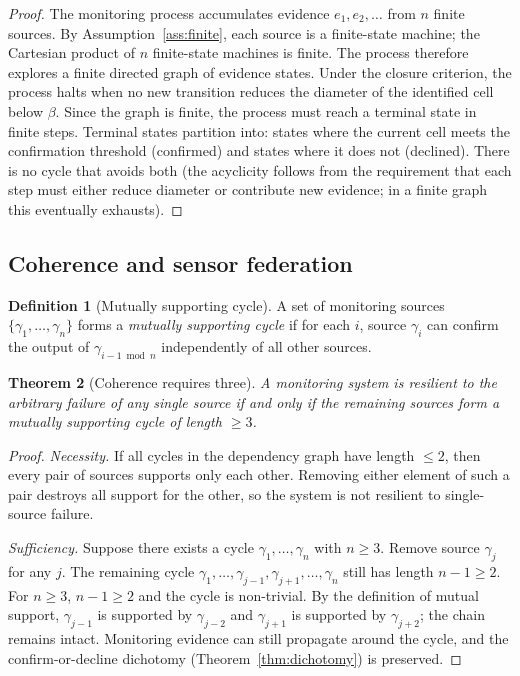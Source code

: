 \documentclass[11pt,twocolumn,a4paper]{article}
\theoremstyle{plain}
\newtheorem{theorem}{Theorem}[section]
\theoremstyle{definition}
\newtheorem{definition}[theorem]{Definition}
\theoremstyle{remark}
\newcommand{\floor}{\beta}
\begin{document}
\begin{proof}
The monitoring process accumulates evidence $e_1, e_2, \ldots$ from $n$ finite sources. By Assumption~\ref{ass:finite}, each source is a finite-state machine; the Cartesian product of $n$ finite-state machines is finite. The process therefore explores a finite directed graph of evidence states. Under the closure criterion, the process halts when no new transition reduces the diameter of the identified cell below $\floor$. Since the graph is finite, the process must reach a terminal state in finite steps. Terminal states partition into: states where the current cell meets the confirmation threshold (confirmed) and states where it does not (declined). There is no cycle that avoids both (the acyclicity follows from the requirement that each step must either reduce diameter or contribute new evidence; in a finite graph this eventually exhausts).
\end{proof}

\subsection{Coherence and sensor federation}

\begin{definition}[Mutually supporting cycle]
\label{def:cycle}
A set of monitoring sources $\{\gamma_1, \ldots, \gamma_n\}$ forms a \emph{mutually supporting cycle} if for each $i$, source $\gamma_i$ can confirm the output of $\gamma_{i-1 \bmod n}$ independently of all other sources.
\end{definition}

\begin{theorem}[Coherence requires three]
\label{thm:coherence}
A monitoring system is resilient to the arbitrary failure of any single source if and only if the remaining sources form a mutually supporting cycle of length $\geq 3$.
\end{theorem}

\begin{proof}
\emph{Necessity.} If all cycles in the dependency graph have length $\leq 2$, then every pair of sources supports only each other. Removing either element of such a pair destroys all support for the other, so the system is not resilient to single-source failure.

\emph{Sufficiency.} Suppose there exists a cycle $\gamma_1, \ldots, \gamma_n$ with $n \geq 3$. Remove source $\gamma_j$ for any $j$. The remaining cycle $\gamma_1, \ldots, \gamma_{j-1}, \gamma_{j+1}, \ldots, \gamma_n$ still has length $n-1 \geq 2$. For $n \geq 3$, $n - 1 \geq 2$ and the cycle is non-trivial. By the definition of mutual support, $\gamma_{j-1}$ is supported by $\gamma_{j-2}$ and $\gamma_{j+1}$ is supported by $\gamma_{j+2}$; the chain remains intact. Monitoring evidence can still propagate around the cycle, and the confirm-or-decline dichotomy (Theorem~\ref{thm:dichotomy}) is preserved.
\end{proof}
\end{document}
